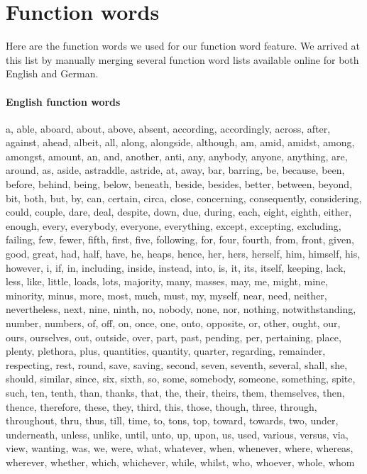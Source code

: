 
\section{Function words}
\label{sec:app_function_words}
Here are the function words we used for our function word feature. We arrived at this list by manually merging several function word lists available online for both English and German.


\paragraph{English function words}
a, able, aboard, about, above, absent, according, accordingly, across, after, against, ahead, albeit, all, along, alongside, although, am, amid, amidst, among, amongst, amount, an, and, another, anti, any, anybody, anyone, anything, are, around, as, aside, astraddle, astride, at, away, bar, barring, be, because, been, before, behind, being, below, beneath, beside, besides, better, between, beyond, bit, both, but, by, can, certain, circa, close, concerning, consequently, considering, could, couple, dare, deal, despite, down, due, during, each, eight, eighth, either, enough, every, everybody, everyone, everything, except, excepting, excluding, failing, few, fewer, fifth, first, five, following, for, four, fourth, from, front, given, good, great, had, half, have, he, heaps, hence, her, hers, herself, him, himself, his, however, i, if, in, including, inside, instead, into, is, it, its, itself, keeping, lack, less, like, little, loads, lots, majority, many, masses, may, me, might, mine, minority, minus, more, most, much, must, my, myself, near, need, neither, nevertheless, next, nine, ninth, no, nobody, none, nor, nothing, notwithstanding, number, numbers, of, off, on, once, one, onto, opposite, or, other, ought, our, ours, ourselves, out, outside, over, part, past, pending, per, pertaining, place, plenty, plethora, plus, quantities, quantity, quarter, regarding, remainder, respecting, rest, round, save, saving, second, seven, seventh, several, shall, she, should, similar, since, six, sixth, so, some, somebody, someone, something, spite, such, ten, tenth, than, thanks, that, the, their, theirs, them, themselves, then, thence, therefore, these, they, third, this, those, though, three, through, throughout, thru, thus, till, time, to, tons, top, toward, towards, two, under, underneath, unless, unlike, until, unto, up, upon, us, used, various, versus, via, view, wanting, was, we, were, what, whatever, when, whenever, where, whereas, wherever, whether, which, whichever, while, whilst, who, whoever, whole, whom


